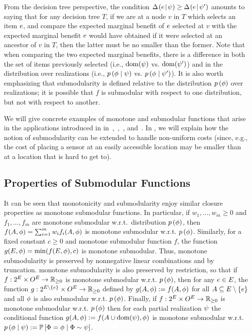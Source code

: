From the decision tree perspective, the condition 
$\Delta \hspace{-0.3mm} \left( { {e}\! \mid \! {{\color{black}{\ensuremath{\psi}}}} } \right)   \ge \Delta \hspace{-0.3mm} \left( { {e}\! \mid \! {{\color{black}{\ensuremath{\psi}}}'} } \right)  $ amounts to saying that
for any decision tree $T$, if we are at a node $v$ in $T$ which selects an item $e$, and compare the
expected marginal benefit of $e$ selected at $v$ with the expected marginal benefit
$e$ would have obtained if it were selected at an ancestor of
$v$ in $T$, then the latter must be no smaller than the former.
Note that when comparing the two expected marginal benefits, there is
a difference in both the set of items previously selected
(i.e., $\operatorname{dom}({\color{black}{\ensuremath{\psi}}})$ vs. $\operatorname{dom}({\color{black}{\ensuremath{\psi}}}')$) and in the distribution over
realizations (i.e., ${\color{black}{\ensuremath{p \left( {{\color{black}{\ensuremath{\phi}}} \mid {\color{black}{\ensuremath{\psi}}}} \right) }}}$ vs. ${\color{black}{\ensuremath{p \left( {{\color{black}{\ensuremath{\phi}}} \mid {\color{black}{\ensuremath{\psi}}}'} \right) }}}$).  
It is also worth emphasizing that \term
submodularity is defined relative to the distribution ${\color{black}{\ensuremath{p \left( {{\color{black}{\ensuremath{\phi}}}} \right) }}}$ over
realizations; it is possible that $f$ is
\term submodular with respect to one distribution, but not with
respect to another.




%
We will give concrete examples of \term monotone and \term
submodular functions that arise in the applications introduced in
in~,~,~,
and~. 
%
%
In \appendixA, we will explain how the notion of \term submodularity can be extended to handle non-uniform costs (since, e.g., the cost of placing a sensor at an easily accessible location may be smaller than at a location that is hard to get to).


\subsection{Properties of \Term Submodular Functions} It can be seen that \term monotonicity and \term
submodularity enjoy similar closure properties as monotone submodular
functions.  In particular, if $w_{1},\dots,w_{m}\geq 0$ and
$f_{1},\dots,f_{m}$ are \term monotone submodular w.r.t.~distribution
${\color{black}{\ensuremath{p \left( {{\color{black}{\ensuremath{\phi}}}} \right) }}}$, then $f(A,{\color{black}{\ensuremath{\phi}}}) = \sum_{i=1}^{m}w_{i} f_{i}(A,{\color{black}{\ensuremath{\phi}}})$ is
\term monotone submodular w.r.t. ${\color{black}{\ensuremath{p \left( {{\color{black}{\ensuremath{\phi}}}} \right) }}}$.  
Similarly, for a fixed constant $c\geq 0$ and \term monotone
submodular function $f$, the function $g(E,{\color{black}{\ensuremath{\phi}}})=\min(f(E,{\color{black}{\ensuremath{\phi}}}),c)$ is
\term monotone submodular.
Thus, \term monotone submodularity is preserved by nonnegative linear combinations and by truncation.
\Term monotone submodularity is also preserved by 
restriction, so that if 
$f:2^{E} \times O^{E} \to \mathbb{R}_{\ge 0}$
is \term monotone submodular w.r.t. ${\color{black}{\ensuremath{p \left( {{\color{black}{\ensuremath{\phi}}}} \right) }}}$, then for any $e \in E$, the function 
$g : 2^{E \setminus \left\{e\right\}} \times O^{E} \to \mathbb{R}_{\ge 0}$
defined by $g(A, {\color{black}{\ensuremath{\phi}}}) := f(A, {\color{black}{\ensuremath{\phi}}})$ for all $A \subseteq E
\setminus \left\{e\right\}$ and all ${\color{black}{\ensuremath{\phi}}}$ is also \term submodular w.r.t. ${\color{black}{\ensuremath{p \left( {{\color{black}{\ensuremath{\phi}}}} \right) }}}$.
%
Finally, if 
$f:2^{E} \times O^{E} \to \mathbb{R}_{\ge 0}$
is \term monotone submodular w.r.t. ${\color{black}{\ensuremath{p \left( {{\color{black}{\ensuremath{\phi}}}} \right) }}}$ then for each partial
realization ${\color{black}{\ensuremath{\psi}}}$ the conditional function  
$g(A, {\color{black}{\ensuremath{\phi}}}) := f(A \cup \operatorname{dom}({\color{black}{\ensuremath{\psi}}}), {\color{black}{\ensuremath{\phi}}})$
%
is \term monotone
submodular w.r.t. ${\color{black}{\ensuremath{p \left( {{\color{black}{\ensuremath{\phi}}} \mid {\color{black}{\ensuremath{\psi}}}} \right) }}} := \mathbb{P}\left[{\color{black}{\ensuremath{\Phi}}} = {\color{black}{\ensuremath{\phi}}} \mid
  {\color{black}{\ensuremath{\Phi}}} \sim {\color{black}{\ensuremath{\psi}}}\right] $.


